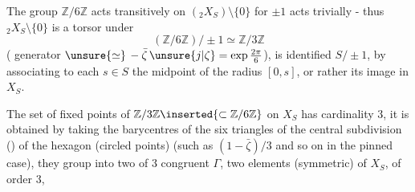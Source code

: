 
The group $\mathbb Z/6\mathbb Z$ acts transitively on $({}_2X_S)\setminus\{0\}$ \unsure{(}for $\pm1$ acts trivially - thus \({}_2X_S\setminus\{0\}\) is a torsor under
\[
(\mathbb Z/6\mathbb Z)/\pm1\simeq\mathbb Z/3\mathbb Z
\]
 ( generator $\unsure{\simeq}\,-\bar\zeta\,\unsure{j|\zeta}=\exp\frac{2\pi}{6}$),
  is identified  $S/\pm1$, by associating to each $s\in S$ the midpoint of the radius $[0,s]$, or rather its image \inserted{)} in $X_S$.

The set of fixed points of $\mathbb Z/3\mathbb Z\inserted{\subset\mathbb Z/6\mathbb Z}$ on $X_S$ has cardinality 3, it is obtained by taking the barycentres of the six triangles of the central subdivision () of the hexagon (circled points) (such as $(1-\bar\zeta)/3$ and so on in the pinned case), they group into two  of 3  congruent  $\Gamma$,  two elements (symmetric) of $X_S$, of order 3,

